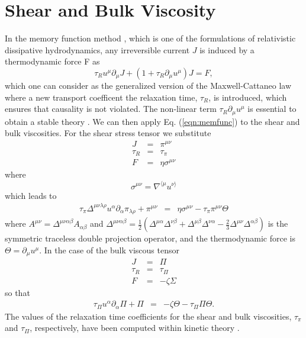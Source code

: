 \documentclass[aps,article]{revtex4}
\begin{document}
\section{Shear and Bulk Viscosity}

In the memory function method \cite{Denicol:2010tr}, which is one of the formulations
of relativistic dissipative hydrodynamics, any irreversible current $J$ is induced by a thermodynamic force F as
\begin{equation}\label{eqn:memfunc}
\tau_{R}u^{\mu}\partial_{\mu}J+\left(1+\tau_R \partial_{\mu}u^{\mu}\right)J=F,
\end{equation}
which one can consider as the generalized version of the Maxwell-Cattaneo law where a new transport coefficent the relaxation time, $\tau_R$, is introduced, which ensures that causality is not violated.  The non-linear term $\tau_R \partial_{\mu}u^{\mu}$  is essential to obtain a stable theory \cite{Denicol:2008ha}.
We can then apply Eq. (\ref{eqn:memfunc}) to the shear and bulk viscosities.  For the shear stress tensor we substitute
\begin{eqnarray}
J&=&\pi^{\mu\nu}\nonumber\\
\tau_R&=&\tau_{\pi}\nonumber\\
F&=&\eta\sigma^{\mu\nu}
\end{eqnarray}
where 
\begin{equation}
\sigma^{\mu\nu}=\nabla^{\langle\mu}u^{\nu\rangle}
\end{equation}
which leads to
\begin{eqnarray}
\tau_{\pi}\Delta^{\mu\nu\lambda\rho}u^{\alpha}\partial_{\alpha}\pi_{\lambda\rho}+\pi^{\mu\nu}&=&\eta\sigma^{\mu\nu}-\tau_{\pi}\pi^{\mu\nu}\Theta
\end{eqnarray}
where $A^{\mu\nu}=\Delta^{\mu\nu\alpha\beta}A_{\alpha\beta}$ and $\Delta^{\mu\nu\alpha\beta}=\frac{1}{2}\left(\Delta^{\mu\alpha}\Delta^{\nu\beta}+\Delta^{\mu\beta}\Delta^{\nu\alpha}-\frac{2}{3}\Delta^{\mu\nu}\Delta^{\alpha\beta}\right)$ is 
the symmetric traceless double projection operator, and the thermodynamic force is $\Theta=\partial_{\mu}u^{\mu}$. 
In the case of the bulk viscous tensor
\begin{eqnarray}
J&=&\Pi\nonumber\\
\tau_R&=&\tau_{\Pi}\nonumber\\
F&=&-\zeta\Sigma
\end{eqnarray}
so that
\begin{eqnarray}
\tau_{\Pi}u^{\alpha}\partial_{\alpha}\Pi+\Pi&=&-\zeta\Theta-\tau_{\Pi}\Pi\Theta.
\end{eqnarray}
The values of the relaxation time coefficients for the shear 
and bulk viscosities, $\tau_\pi$ and $\tau_\Pi$, respectively, have been computed within kinetic theory \cite{Denicol:2010xn}.  
\end{document}

